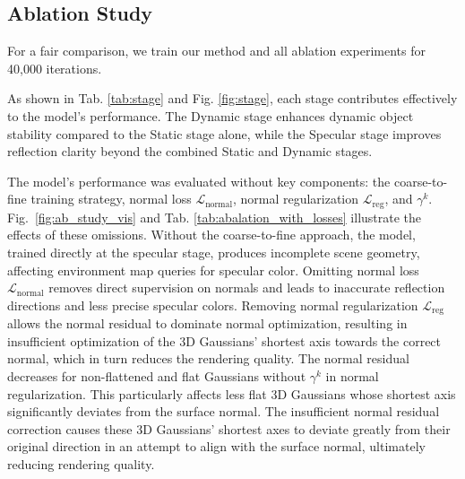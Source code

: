 \subsection{Ablation Study}
For a fair comparison, we train our method and all ablation
experiments for 40,000 iterations.





\vspace{3pt}  
As shown in Tab. \ref{tab:stage} and Fig. \ref{fig:stage}, each stage contributes effectively to the model's performance. The Dynamic stage enhances dynamic object stability compared to the Static stage alone, while the Specular stage improves reflection clarity beyond the combined Static and Dynamic stages. 




\vspace{3pt}  
The model's performance was evaluated without key components: the coarse-to-fine training strategy, normal loss $\mathcal{L}_{\text{normal}}$, normal regularization $\mathcal{L}_{\text{reg}}$, and $\gamma^k$. Fig.~\ref{fig:ab_study_vis} and Tab. \ref{tab:abalation_with_losses} illustrate the effects of these omissions.
Without the coarse-to-fine approach, the model, trained directly at the specular stage, produces incomplete scene geometry, affecting environment map queries for specular color. Omitting normal loss $\mathcal{L}_{\text{normal}}$ removes direct supervision on normals and leads to inaccurate reflection directions and less precise specular colors. Removing normal regularization $\mathcal{L}_{\text{reg}}$ allows the normal residual to dominate normal optimization, resulting in insufficient optimization of the 3D Gaussians' shortest axis towards the correct normal, which in turn reduces the rendering quality. The normal residual decreases for non-flattened and flat Gaussians without $\gamma^k$ in normal regularization. This particularly affects less flat  3D Gaussians whose shortest axis significantly deviates from the surface normal. The insufficient normal residual correction causes these 3D Gaussians' shortest axes to deviate greatly from their original direction in an attempt to align with the surface normal, ultimately reducing rendering quality. 




